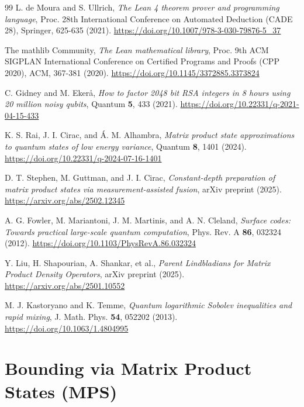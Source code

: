 \documentclass[12pt,a4paper]{article}
\theoremstyle{plain}
\theoremstyle{definition}
\theoremstyle{remark}
\begin{document}
\begin{thebibliography}{99}
L. de Moura and S. Ullrich, \textit{The Lean 4 theorem prover and programming language}, Proc. 28th International Conference on Automated Deduction (CADE 28), Springer, 625-635 (2021). \url{https://doi.org/10.1007/978-3-030-79876-5_37}

The mathlib Community, \textit{The Lean mathematical library}, Proc. 9th ACM SIGPLAN International Conference on Certified Programs and Proofs (CPP 2020), ACM, 367-381 (2020). \url{https://doi.org/10.1145/3372885.3373824}

C. Gidney and M. Ekerå, \textit{How to factor 2048 bit RSA integers in 8 hours using 20 million noisy qubits}, Quantum \textbf{5}, 433 (2021). \url{https://doi.org/10.22331/q-2021-04-15-433}

K. S. Rai, J. I. Cirac, and Á. M. Alhambra, \textit{Matrix product state approximations to quantum states of low energy variance}, Quantum \textbf{8}, 1401 (2024). \url{https://doi.org/10.22331/q-2024-07-16-1401}

D. T. Stephen, M. Guttman, and J. I. Cirac, \textit{Constant-depth preparation of matrix product states via measurement-assisted fusion}, arXiv preprint (2025). \url{https://arxiv.org/abs/2502.12345}

A. G. Fowler, M. Mariantoni, J. M. Martinis, and A. N. Cleland, \textit{Surface codes: Towards practical large-scale quantum computation}, Phys. Rev. A \textbf{86}, 032324 (2012). \url{https://doi.org/10.1103/PhysRevA.86.032324}

Y. Liu, H. Shapourian, A. Shankar, et al., \textit{Parent Lindbladians for Matrix Product Density Operators}, arXiv preprint (2025). \url{https://arxiv.org/abs/2501.10552}

M. J. Kastoryano and K. Temme, \textit{Quantum logarithmic Sobolev inequalities and rapid mixing}, J. Math. Phys. \textbf{54}, 052202 (2013). \url{https://doi.org/10.1063/1.4804995}

\end{thebibliography}

\appendix

\section{Bounding via Matrix Product States (MPS)}
\label{app:mps}
\end{document}
